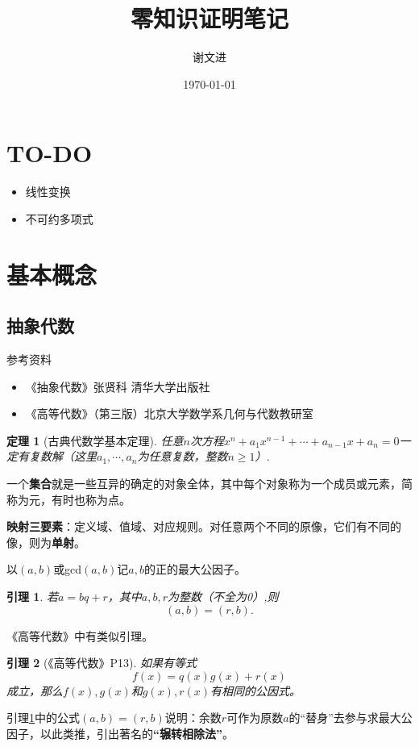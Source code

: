 \documentclass[10pt]{ctexart}
\title{零知识证明笔记}
\author{谢文进}
\date{\today}
\newtheorem{lemma}{引理}
\newtheorem{theorem}{定理}
\begin{document}
\maketitle
\tableofcontents

\section{TO-DO}
\begin{itemize}
	\item 线性变换
	\item 不可约多项式
\end{itemize}

\section{基本概念}
\subsection{抽象代数}
参考资料
\begin{itemize}
	\item 《抽象代数》张贤科 { } 清华大学出版社
	\item 《高等代数》（第三版）北京大学数学系几何与代数教研室
\end{itemize}

\begin{theorem}[古典代数学基本定理]
	任意$n$次方程$x^n+a_1x^{n-1}+ \cdots + a_{n-1}x + a_n = 0$一定有复数解（这里$a_1, \cdots, a_n$为任意复数，整数$n \ge 1$）.
\end{theorem}

一个\textbf{集合}就是一些互异的确定的对象全体，其中每个对象称为一个成员或元素，简称为元，有时也称为点。

\textbf{映射三要素}：定义域、值域、对应规则。对任意两个不同的原像，它们有不同的像，则为\textbf{单射}。

以$(a,b)$或gcd$(a,b)$记$a,b$的正的最大公因子。
\begin{lemma}\label{lemma:abqr}
	若$a=bq+r$，其中$a,b,r$为整数（不全为0）,则
	$$
	(a,b)=(r,b).
	$$
\end{lemma}
《高等代数》中有类似引理。
\begin{lemma}[《高等代数》P13]
	如果有等式
	\begin{equation}
		f(x) = q(x)g(x)+r(x)
	\end{equation}
	成立，那么$f(x),g(x)$和$g(x),r(x)$有相同的公因式。
\end{lemma}

引理\ref{lemma:abqr}中的公式$(a,b)=(r,b)$说明：余数$r$可作为原数$a$的“替身”去参与求最大公因子，以此类推，引出著名的\textbf{“辗转相除法”}。
\end{document}
